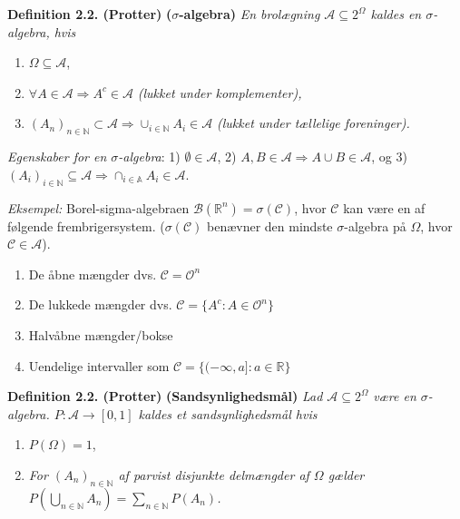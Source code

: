 \documentclass[a4paper,12pt,openany]{book}
\providecommand{\tightlist}{%
 \setlength{\itemsep}{0pt}\setlength{\parskip}{0pt}}
\begin{document}
\textbf{Definition 2.2. (Protter)} \textbf{(\(\mathit{\sigma}\)-algebra)} \emph{En brolægning \(\mathcal{A}\subseteq 2^\Omega\) kaldes en \(\sigma\)-algebra, hvis}

\begin{enumerate}
\def\labelenumi{\arabic{enumi}.}
\tightlist
\item
  \(\Omega\subseteq\mathcal{A}\),
\item
  \(\forall A\in\mathcal{A} \Rightarrow A^c\in\mathcal{A}\) \emph{(lukket under komplementer),}
\item
  \((A_n)_{n\in\mathbb{N}}\subset\mathcal{A}\Rightarrow \cup_{i\in\mathbb{N}} A_i\in\mathcal{A}\) \emph{(lukket under tællelige foreninger).}
\end{enumerate}

\emph{Egenskaber for en \(\sigma\)-algebra}: 1) \(\emptyset\in\mathcal{A}\), 2) \(A,B\in\mathcal{A}\Rightarrow A \cup B\in\mathcal{A}\), og 3) \((A_i)_{i\in\mathbb{N}}\subseteq\mathcal{A}\Rightarrow\cap_{i\in\mathbb{A}}A_i\in\mathcal{A}\).

\emph{Eksempel:} Borel-sigma-algebraen \(\mathcal{B}(\mathbb{R}^n)=\sigma(\mathcal{C})\), hvor \(\mathcal{C}\) kan være en af følgende frembrigersystem. (\(\sigma(\mathcal{C})\) benævner den mindste \(\sigma\)-algebra på \(\Omega\), hvor \(\mathcal{C}\in\mathcal{A}\)).

\begin{enumerate}
\def\labelenumi{\roman{enumi}.}
\tightlist
\item
  De åbne mængder dvs. \(\mathcal{C}=\mathcal{O}^n\)
\item
  De lukkede mængder dvs. \(\mathcal{C}=\{A^c : A\in\mathcal{O}^n\}\)
\item
  Halvåbne mængder/bokse
\item
  Uendelige intervaller som \(\mathcal{C}=\{(-\infty,a] : a\in\mathbb{R}\}\)
\end{enumerate}

\textbf{Definition 2.2. (Protter)} \textbf{(Sandsynlighedsmål)} \emph{Lad \(\mathcal{A}\subseteq2^\Omega\) være en \(\sigma\)-algebra. \(P : \mathcal{A}\to[0,1]\) kaldes et sandsynlighedsmål hvis}

\begin{enumerate}
\def\labelenumi{\arabic{enumi}.}
\tightlist
\item
  \(P(\Omega)=1\),
\item
  \emph{For \((A_n)_{n\in\mathbb{N}}\) af parvist disjunkte delmængder af \(\Omega\) gælder \(P\left(\bigcup_{n\in\mathbb{N}}A_n\right)=\sum_{n\in\mathbb{N}}P(A_n)\).}
\end{enumerate}
\end{document}
